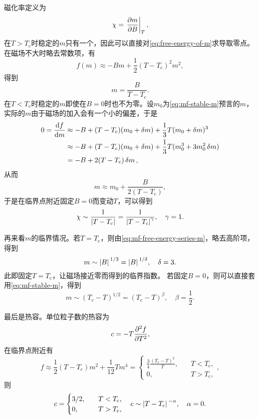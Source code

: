 \documentclass[hyperref, UTF8, a4paper]{ctexart}
\begin{document}
磁化率定义为
\[
    \chi = \eval{\pdv{m}{B}}_{T},
\]
在$T>T_\text{c}$时稳定的$m$只有一个，因此可以直接对\eqref{eq:free-energy-of-m}求导取零点。
在磁场不大时略去常数项，有
\[
    f(m) \approx - B m + \frac{1}{2} (T-T_\text{c})^2 m^2,
\]
得到
\[
    m = \frac{B}{T-T_\text{c}}.
\]
在$T<T_\text{c}$时稳定的$m$即使在$B=0$时也不为零。设$m_0$为\eqref{eq:mf-stable-m}预言的$m$，实际的$m$由于磁场的加入会有一个小的偏差，于是
\[
    \begin{aligned}
        0 = \dv{f}{m} &\approx - B + (T - T_\text{c}) (m_0 + \var{m}) + \frac{1}{3} T (m_0 + \var{m})^3 \\
        &\approx - B + (T-T_\text{c}) (m_0 + \var{m}) + \frac{1}{3} T (m_0^3 + 3 m_0^2 \var{m}) \\
        &= - B + 2(T-T_\text{c}) \var{m},
    \end{aligned}
\]
从而
\[
    m \approx m_0 + \frac{B}{2(T-T_\text{c})},
\]
于是在临界点附近固定$B=0$而变动$T$，可以得到
\begin{equation}
    \chi \sim \frac{1}{\abs{T-T_\text{c}}} = \frac{1}{\abs{T-T_\text{c}}^\gamma}, \quad \gamma = 1. 
\end{equation}

再来看$m$的临界情况。若$T=T_\text{c}$，则由\eqref{eq:mf-free-energy-series-m}，略去高阶项，得到
\begin{equation}
    m \sim \abs*{B}^{1/3} = \abs*{B}^{1/\delta}, \quad \delta = 3.
\end{equation}
此即固定$T=T_\text{c}$，让磁场接近零而得到的临界指数。
若固定$B=0$，则可以直接套用\eqref{eq:mf-stable-m}，得到
\begin{equation}
    m \sim (T_\text{c}-T)^{1/2} = (T_\text{c}-T)^\beta, \quad \beta = \frac{1}{2}.
\end{equation}

最后是热容。单位粒子数的热容为
\[
    c = - T \pdv[2]{f}{T},
\]
在临界点附近有
\[
    f \approx \frac{1}{2} (T-T_\text{c}) m^2 + \frac{1}{12} T m^4 
    = \begin{cases}
        \frac{3}{4} \frac{(T_\text{c}-T)^2}{T}, &\quad T < T_\text{c}, \\
        0, &\quad T > T_\text{c},
    \end{cases},
\]
则
\begin{equation}
    c = \begin{cases}
        3/2, &\quad T < T_\text{c}, \\
        0, &\quad T > T_\text{c}, 
    \end{cases}
    \quad c \sim \abs*{T-T_\text{c}}^{-\alpha}, \quad \alpha = 0.
    \label{eq:mf-c-divergence}
\end{equation}
\end{document}
